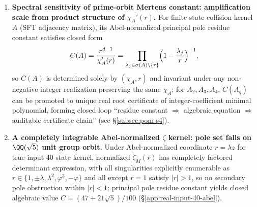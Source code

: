 \begin{enumerate}
  \item \textbf{Spectral sensitivity of prime-orbit Mertens constant: amplification scale from product structure of \texorpdfstring{$\chi_A'(r)$}{chi'(r)}.}
  For finite-state collision kernel \(A\) (SFT adjacency matrix), its Abel-normalized principal pole residue constant satisfies closed form
  \[
  C(A)=\frac{r^{d-1}}{\chi_A'(r)}=\prod_{\lambda_j\in\sigma(A)\setminus\{r\}}\Bigl(1-\frac{\lambda_j}{r}\Bigr)^{-1},
  \]
  so \(C(A)\) is determined solely by \((\chi_A,r)\) and invariant under any non-negative integer realization preserving the same \(\chi_A\); for \(A_2,A_3,A_4\), \(C(A_q)\) can be promoted to unique real root certificate of integer-coefficient minimal polynomial, forming closed loop ``residue constant \(\Rightarrow\) algebraic equation \(\Rightarrow\) auditable certificate chain'' (see \S\ref{subsec:pom-s4}).

  \item \textbf{A completely integrable Abel-normalized \texorpdfstring{$\zeta$}{zeta} kernel: pole set falls on \texorpdfstring{$\QQ(\sqrt5)$}{Q(sqrt5)} unit group orbit.}
  Under Abel-normalized coordinate \(r=\lambda z\) for true input 40-state kernel, normalized \(\widetilde{\zeta}_M(r)\) has completely factored determinant expression, with all singularities explicitly enumerable as
  \(
  r\in\{1,\pm\lambda,\lambda^2,\varphi^3,-\varphi\}
  \)
  and all except \(r=1\) satisfy \(|r|>1\), so no secondary pole obstruction within \(|r|<1\); principal pole residue constant yields closed algebraic value
  \(
  C=(47+21\sqrt5)/100
  \)
  (\S\ref{app:real-input-40-abel}).
\end{enumerate}

